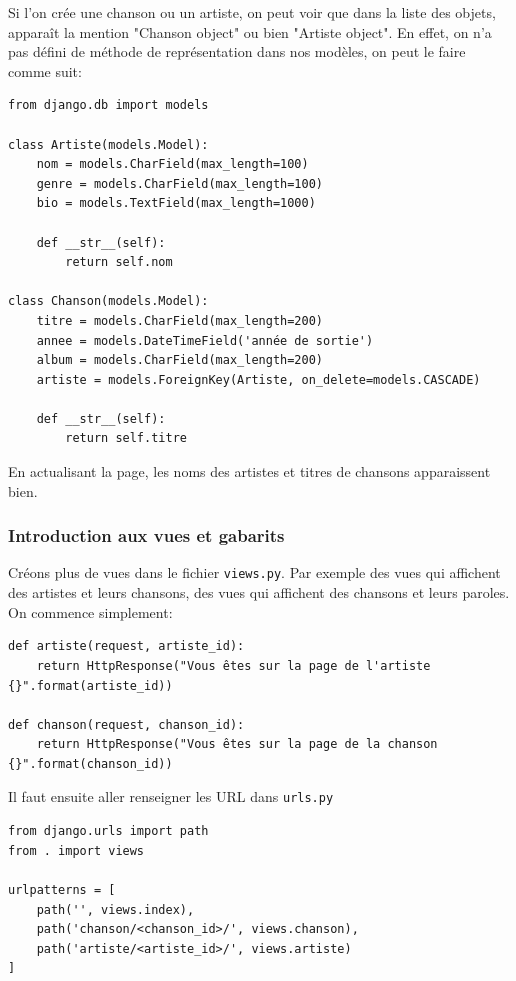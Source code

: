 \documentclass[a4paper, 10pt]{article}
\begin{document}
Si l'on crée une chanson ou un artiste, on peut voir que dans la liste des objets, apparaît la mention "Chanson object" ou bien "Artiste object". En effet, on n'a pas défini de méthode de représentation dans nos modèles, on peut le faire comme suit:
\begin{verbatim}
from django.db import models

class Artiste(models.Model):
    nom = models.CharField(max_length=100)
    genre = models.CharField(max_length=100)
    bio = models.TextField(max_length=1000)

    def __str__(self):
        return self.nom

class Chanson(models.Model):
    titre = models.CharField(max_length=200)
    annee = models.DateTimeField('année de sortie')
    album = models.CharField(max_length=200)
    artiste = models.ForeignKey(Artiste, on_delete=models.CASCADE)

    def __str__(self):
        return self.titre
\end{verbatim}

En actualisant la page, les noms des artistes et titres de chansons apparaissent bien.

\subsubsection{Introduction aux vues et gabarits}
Créons plus de vues dans le fichier \texttt{views.py}. Par exemple des vues qui affichent des artistes et leurs chansons, des vues qui affichent des chansons et leurs paroles. On commence simplement:

\begin{verbatim}
def artiste(request, artiste_id):
    return HttpResponse("Vous êtes sur la page de l'artiste {}".format(artiste_id))

def chanson(request, chanson_id):
    return HttpResponse("Vous êtes sur la page de la chanson {}".format(chanson_id))
\end{verbatim}

Il faut ensuite aller renseigner les URL dans \texttt{urls.py}
\begin{verbatim}
from django.urls import path
from . import views

urlpatterns = [
    path('', views.index),
    path('chanson/<chanson_id>/', views.chanson),
    path('artiste/<artiste_id>/', views.artiste)
]
\end{verbatim}
\end{document}
